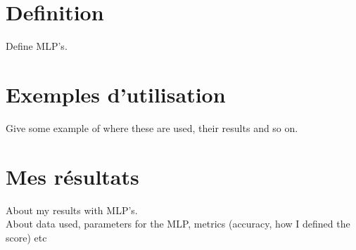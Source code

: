 \section{Definition}
Define MLP's.\\

\section{Exemples d'utilisation}
Give some example of where these are used, their results and so on.\\

\section{Mes résultats}
About my results with MLP's.\\

About data used, parameters for the MLP, metrics (accuracy, how I defined the score) etc